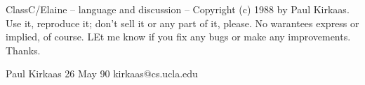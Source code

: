 ClassC/Elaine -- language and discussion -- Copyright (c) 1988
by Paul Kirkaas.  Use it, reproduce it; don't sell it or any part
of it, please.  No warantees express or implied, of course.  LEt me
know if you fix any bugs or make any improvements.  Thanks.

Paul Kirkaas				26 May 90
kirkaas@cs.ucla.edu
